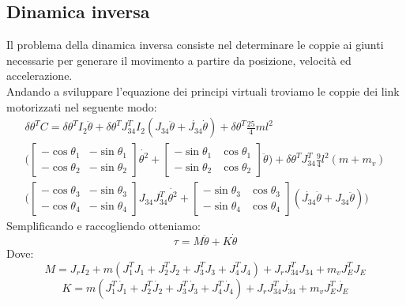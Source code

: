 \subsection{Dinamica inversa}
Il problema della dinamica inversa consiste nel determinare le coppie ai giunti necessarie per generare il movimento a partire da posizione, velocità ed accelerazione.
\\Andando a sviluppare l'equazione dei principi virtuali troviamo le coppie dei link motorizzati nel seguente modo:
\begin{equation*}
\begin{aligned}
    \delta \theta^T C = \delta \theta^T I_2 \ddot{\theta} + \delta \theta^T J_{34}^T I_2(J_{34}\ddot{\theta}+\dot{J_{34}}\dot{\theta})+ \delta \theta^T \frac{25}{4}ml^2\\\bigg(\begin{bmatrix}
    -\cos\theta_1 & -\sin\theta_1 \\ -\cos\theta_2 & -\sin\theta_2
    \end{bmatrix}
    \dot{\theta^2} + \begin{bmatrix}
    -\sin\theta_1 & \cos\theta_1 \\ -\sin\theta_2 & \cos\theta_2
    \end{bmatrix} \ddot{\theta}\bigg) +  \delta \theta^T J_{34}^T\frac{9}{4}l^2(m+m_v)\\\bigg(\begin{bmatrix}
    -\cos\theta_3 & -\sin\theta_3 \\ -\cos\theta_4 & -\sin\theta_4
    \end{bmatrix}J_{34}J_{34}^T\dot{\theta^2}+\begin{bmatrix}
    -\sin\theta_3 & \cos\theta_3 \\ -\sin\theta_4 & \cos\theta_4
    \end{bmatrix}(\dot{J_{34}}\dot{\theta}+J_{34}\ddot{\theta})\bigg)
    \end{aligned}
\end{equation*}
Semplificando e raccogliendo otteniamo:
\begin{equation}
    \tau = M \ddot{\theta} + K \dot{\theta}
    \label{eq:dinamicaInv}
\end{equation}
Dove:
\begin{equation}
    M = J_r I_2 + m(J_1^T J_1 + J_2^TJ_2+J_3^TJ_3+J_4^TJ_4)+J_rJ_{34}^TJ_{34} + m_vJ_E^TJ_E
    \label{eq:M}
\end{equation}
\begin{equation}
    K = m(J_1^T\dot{J_1}+J_2^T\dot{J_2}+J_3^T\dot{J_3}+J_4^T\dot{J_4})+J_rJ_{34}^T\dot{J_{34}}+m_vJ_E^T\dot{J_E}
    \label{eq:K}
\end{equation}
